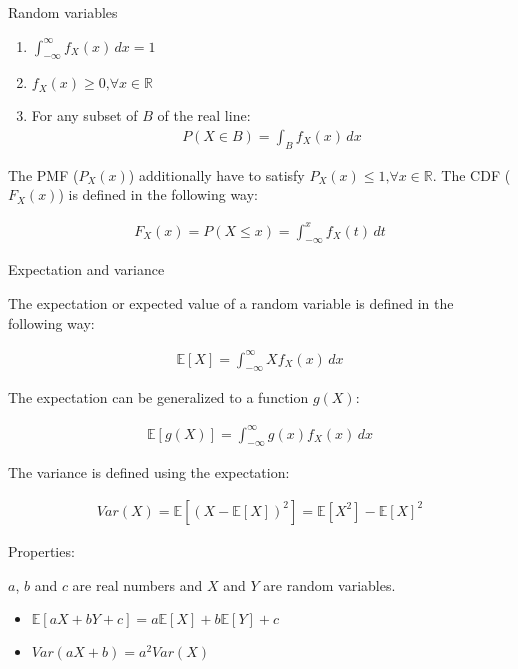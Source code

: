 \documentclass{beamer}
\begin{document}
\begin{frame}
\begin{columns}
\begin{column}{0.3\textwidth}
\begin{block}{Random variables}
\begin{enumerate}
    \item $\int_{-\infty}^{\infty} f_X(x) \,dx = 1$
    \item $f_X(x) \geq 0 \text{,} \forall x \in \mathbb{R}$
    \item For any subset of $B$ of the real line:
    \begin{align*}
        P(X \in B) = \int_B f_X(x) \,dx
    \end{align*}
\end{enumerate}

The PMF ($P_X(x)$) additionally have to satisfy $P_X(x) \leq 1 \text{,} \forall x \in \mathbb{R}$. The CDF ($F_X(x)$) is defined in the following way:

\begin{align*}
    F_X(x) = P(X \leq x) = \int_{-\infty}^{x} f_X(t) \,dt
\end{align*}

\end{block}

\begin{block}{Expectation and variance}

The expectation or expected value of a random variable is defined in the following way:

\begin{align*}
    \mathbb{E}[X] = \int_{-\infty}^{\infty} Xf_X(x) \, dx
\end{align*}

The expectation can be generalized to a function $g(X)$:

\begin{align*}
    \mathbb{E}[g(X)] = \int_{-\infty}^{\infty} g(x)f_X(x) \,dx
\end{align*}

The variance is defined using the expectation:

\begin{align*}
    Var(X) = \mathbb{E}[(X - \mathbb{E}[X])^2] = \mathbb{E}[X^2] - \mathbb{E}[X]^2
\end{align*}

Properties:

$a$, $b$ and $c$ are real numbers and $X$ and $Y$ are random variables.

\begin{itemize}
    \item $\mathbb{E}[aX + bY + c] = a\mathbb{E}[X] + b\mathbb{E}[Y] + c$
    \item $Var(aX + b) = a^2Var(X)$
\end{itemize}


\end{block}
\end{column}
\end{columns}
\end{frame}
\end{document}
